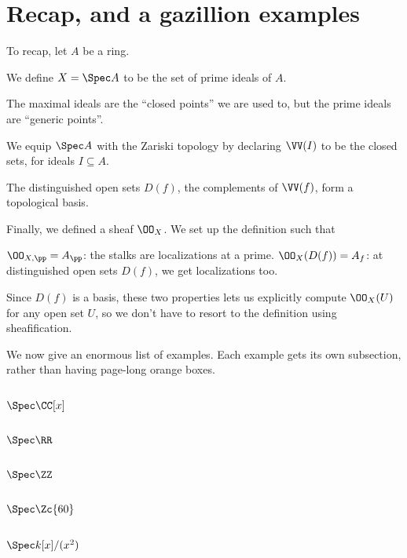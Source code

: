 \section{Recap, and a gazillion examples}
To recap, let $A$ be a ring.
\begin{itemize}
	\ii We define $X = \Spec A$ to be the set of prime ideals of $A$.
	\begin{itemize}
		\ii The maximal ideals are the ``closed points'' we are used to,
		but the prime ideals are ``generic points''.
	\end{itemize}

	\ii We equip $\Spec A$ with the Zariski topology by declaring
	$\VV(I)$ to be the closed sets, for ideals $I \subseteq A$.
	\begin{itemize}
		\ii The distinguished open sets $D(f)$,
		the complements of $\VV(f)$, form a topological basis.
	\end{itemize}

	\ii Finally, we defined a sheaf $\OO_X$.
	We set up the definition such that
	\begin{itemize}
		\ii $\OO_{X,\pp} = A_\pp$:
		the stalks are localizations at a prime.
		\ii $\OO_{X}(D(f)) = A_f$:
		at distinguished open sets $D(f)$,
		we get localizations too.
	\end{itemize}
	Since $D(f)$ is a basis,
	these two properties lets us explicitly compute $\OO_X(U)$
	for any open set $U$,
	so we don't have to resort to the definition using sheafification.
\end{itemize}

We now give an enormous list of examples.
Each example gets its own subsection,
rather than having page-long orange boxes.

\subsection{$\Spec \CC[x]$}
\subsection{$\Spec \RR$}
\subsection{$\Spec \ZZ$}
\subsection{$\Spec \Zc{60}$}
\subsection{$\Spec k[x]/(x^2)$}
